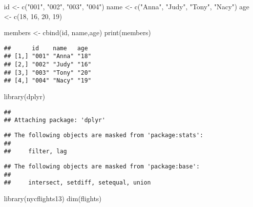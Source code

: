 \documentclass[
]{article}
\newenvironment{Shaded}{\begin{snugshade}}{\end{snugshade}}
\newcommand{\DecValTok}[1]{\textcolor[rgb]{0.00,0.00,0.81}{#1}}
\newcommand{\FunctionTok}[1]{\textcolor[rgb]{0.00,0.00,0.00}{#1}}
\newcommand{\NormalTok}[1]{#1}
\newcommand{\OtherTok}[1]{\textcolor[rgb]{0.56,0.35,0.01}{#1}}
\newcommand{\StringTok}[1]{\textcolor[rgb]{0.31,0.60,0.02}{#1}}
\begin{document}
\begin{Shaded}
\begin{Highlighting}[]
\NormalTok{id }\OtherTok{\textless{}{-}} \FunctionTok{c}\NormalTok{(}\StringTok{"001"}\NormalTok{, }\StringTok{"002"}\NormalTok{, }\StringTok{"003"}\NormalTok{, }\StringTok{"004"}\NormalTok{)}
\NormalTok{name }\OtherTok{\textless{}{-}} \FunctionTok{c}\NormalTok{(}\StringTok{"Anna"}\NormalTok{, }\StringTok{"Judy"}\NormalTok{, }\StringTok{"Tony"}\NormalTok{, }\StringTok{"Nacy"}\NormalTok{)}
\NormalTok{age }\OtherTok{\textless{}{-}} \FunctionTok{c}\NormalTok{(}\DecValTok{18}\NormalTok{, }\DecValTok{16}\NormalTok{, }\DecValTok{20}\NormalTok{, }\DecValTok{19}\NormalTok{)}

\NormalTok{members }\OtherTok{\textless{}{-}} \FunctionTok{cbind}\NormalTok{(id, name,age)}
\FunctionTok{print}\NormalTok{(members)}
\end{Highlighting}
\end{Shaded}

\begin{verbatim}
##      id    name   age 
## [1,] "001" "Anna" "18"
## [2,] "002" "Judy" "16"
## [3,] "003" "Tony" "20"
## [4,] "004" "Nacy" "19"
\end{verbatim}

\begin{Shaded}
\begin{Highlighting}[]
\FunctionTok{library}\NormalTok{(dplyr)}
\end{Highlighting}
\end{Shaded}

\begin{verbatim}
## 
## Attaching package: 'dplyr'
\end{verbatim}

\begin{verbatim}
## The following objects are masked from 'package:stats':
## 
##     filter, lag
\end{verbatim}

\begin{verbatim}
## The following objects are masked from 'package:base':
## 
##     intersect, setdiff, setequal, union
\end{verbatim}

\begin{Shaded}
\begin{Highlighting}[]
\FunctionTok{library}\NormalTok{(nycflights13)}
\FunctionTok{dim}\NormalTok{(flights)}
\end{Highlighting}
\end{Shaded}
\end{document}

